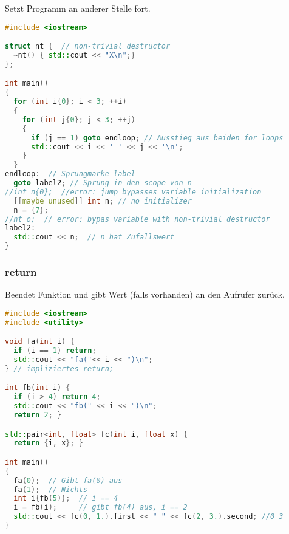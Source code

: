 \documentclass[10pt,twocolumn]{scrartcl}
\begin{document}
Setzt Programm an anderer Stelle fort.

\begin{lstlisting}[language=C++]
#include <iostream>

struct nt {  // non-trivial destructor
  ~nt() { std::cout << "X\n";}
};

int main()
{
  for (int i{0}; i < 3; ++i)
  {
    for (int j{0}; j < 3; ++j)
    {
      if (j == 1) goto endloop; // Ausstieg aus beiden for loops
      std::cout << i << ' ' << j << '\n';
    }
  }
endloop:  // Sprungmarke label
  goto label2; // Sprung in den scope von n
//int n{0};  //error: jump bypasses variable initialization
  [[maybe_unused]] int n; // no initializer
  n = {7};
//nt o;  // error: bypas variable with non-trivial destructor
label2:
  std::cout << n;  // n hat Zufallswert
}
\end{lstlisting}

\subsubsection{return}

Beendet Funktion und gibt Wert (falls vorhanden) an den Aufrufer zurück.

\begin{lstlisting}[language=C++]
#include <iostream>
#include <utility>

void fa(int i) {
  if (i == 1) return;
  std::cout << "fa("<< i << ")\n";
} // impliziertes return;

int fb(int i) {
  if (i > 4) return 4;
  std::cout << "fb(" << i << ")\n";
  return 2; }

std::pair<int, float> fc(int i, float x) {
  return {i, x}; }

int main()
{
  fa(0);  // Gibt fa(0) aus
  fa(1);  // Nichts
  int i{fb(5)};  // i == 4
  i = fb(i);     // gibt fb(4) aus, i == 2
  std::cout << fc(0, 1.).first << " " << fc(2, 3.).second; //0 3
}
\end{lstlisting}


\end{document}
